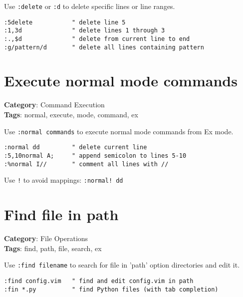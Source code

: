 {{{{{Use {\footnotesize \Verb§:delete§} or {\footnotesize \Verb§:d§} to delete specific lines or line ranges.

\begin{Exa*}{}
\begin{Verbatim}[fontsize=\footnotesize, breaklines, breakanywhere]
:5delete           " delete line 5
:1,3d              " delete lines 1 through 3
:.,$d              " delete from current line to end
:g/pattern/d       " delete all lines containing pattern
\end{Verbatim}
\end{Exa*}

\section{Execute normal mode commands}

\textbf{Category}: Command Execution\\ \textbf{Tags}: normal, execute, mode, command, ex
\vspace{0.5cm}

Use {\footnotesize \Verb§:normal commands§} to execute normal mode commands from Ex mode.

\begin{Exa*}{}
\begin{Verbatim}[fontsize=\footnotesize, breaklines, breakanywhere]
:normal dd         " delete current line
:5,10normal A;     " append semicolon to lines 5-10
:%normal I//       " comment all lines with //
\end{Verbatim}
\end{Exa*}

Use {\footnotesize \Verb§!§} to avoid mappings: {\footnotesize \Verb§:normal! dd§}

\section{Find file in path}

\textbf{Category}: File Operations\\ \textbf{Tags}: find, path, file, search, ex
\vspace{0.5cm}

Use {\footnotesize \Verb§:find filename§} to search for file in 'path' option directories and edit it.

\begin{Exa*}{}
\begin{Verbatim}[fontsize=\footnotesize, breaklines, breakanywhere]
:find config.vim   " find and edit config.vim in path
:fin *.py          " find Python files (with tab completion)
\end{Verbatim}
\end{Exa*}

}}}}}
